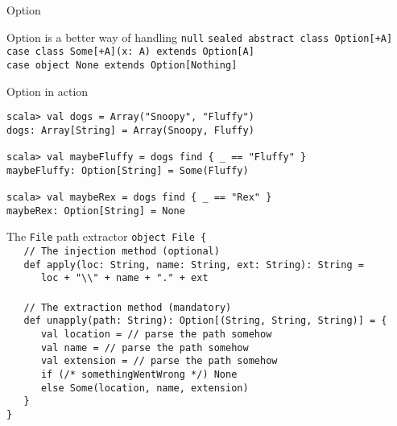 \begin{frame}[fragile]{Option}
\begin{block}{Option is a better way of handling \lstinline!null!}
\lstinline!sealed abstract class Option[+A]!\\
\lstinline!case class Some[+A](x: A) extends Option[A]!\\
\lstinline!case object None extends Option[Nothing]!
\end{block}
\pause
\begin{exampleblock}{Option in action}
\begin{lstlisting}
scala> val dogs = Array("Snoopy", "Fluffy")
dogs: Array[String] = Array(Snoopy, Fluffy)

scala> val maybeFluffy = dogs find { _ == "Fluffy" }
maybeFluffy: Option[String] = Some(Fluffy)

scala> val maybeRex = dogs find { _ == "Rex" }
maybeRex: Option[String] = None
\end{lstlisting}
\end{exampleblock}
\end{frame}

\begin{frame}[fragile]{The \lstinline!File! path extractor}
\lstinline!object File {!\\
\lstinline!   // The injection method (optional)!\\
\lstinline!   def apply(loc: String, name: String, ext: String): String =!\\
\lstinline!      loc + "\\" + name + "." + ext!\\
\lstinline!!\\
\lstinline!   // The extraction method (mandatory)!\\
\lstinline!   def unapply!\lstinline!(path: String)!\lstinline!: Option[(String, String, String)]!\lstinline! = {!\\
\lstinline!      val location = // parse the path somehow!\\
\lstinline!      val name = // parse the path somehow!\\
\lstinline!      val extension = // parse the path somehow!\\
\lstinline!      if (/* somethingWentWrong */) None!\\
\lstinline!      else Some(location, name, extension)!\\
\lstinline!   }!\\
\lstinline!}!
\end{frame}

